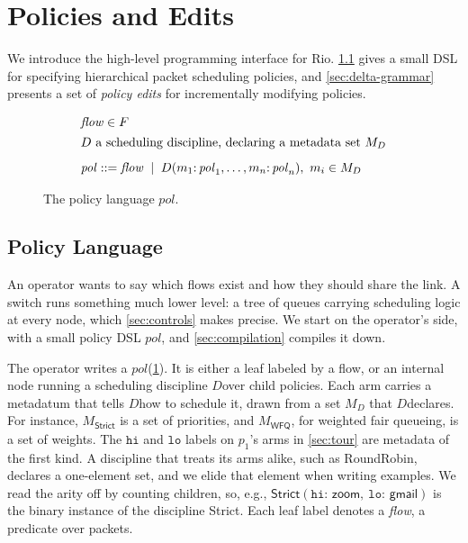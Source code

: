 \documentclass[sigplan,anonymous,review,nonacm]{acmart}
\newcommand{\notation}[1]{\ensuremath{#1}\ifmmode\else\xspace\fi}
\newcommand{\pol}{\notation{\mathit{pol}}}
\newcommand{\disc}{\notation{D}}
\newcommand{\Strict}{\textsf{Strict}}
\newcommand{\WFQ}{\textsf{WFQ}}
\newcommand{\RR}{\textsf{RoundRobin}}
\begin{document}
\section{Policies and Edits}\label{sec:model}

We introduce the high-level programming interface for Rio.
\cref{sec:policy-dsl} gives a small DSL for specifying hierarchical packet scheduling policies,
and \cref{sec:delta-grammar} presents a set of \emph{policy edits} for incrementally modifying policies.

\begin{figure}[t]
\[
\begin{array}{@{}l@{}}
\mathit{flow} \in F\\[4pt]
D\ \text{a scheduling discipline, declaring a metadata set } M_{D}\\[8pt]
\mathit{pol} \mathrel{::=} \mathit{flow} \;\mid\; D(m_1{:}\,\mathit{pol}_1, \ldots, m_n{:}\,\mathit{pol}_n),\ m_i \in M_{D}
\end{array}
\]
\caption{The policy language \(\mathit{pol}\).}
\label{fig:pol-grammar}
\end{figure}

\subsection{Policy Language}\label{sec:policy-dsl}

An operator wants to say which flows exist and how they should share the link.
A switch runs something much lower level: a tree of queues carrying scheduling logic at every node, which \cref{sec:controls} makes precise.
We start on the operator's side, with a small policy DSL \pol, and \cref{sec:compilation} compiles it down.

The operator writes a \pol (\cref{fig:pol-grammar}).
It is either a leaf labeled by a flow, or an internal node running a scheduling discipline \disc over child policies.
Each arm carries a metadatum that tells \disc how to schedule it, drawn from a set \(M_{D}\) that \disc declares.
For instance, \(M_{\Strict}\) is a set of priorities, and \(M_{\WFQ}\), for weighted fair queueing, is a set of weights.
The \(\mathtt{hi}\) and \(\mathtt{lo}\) labels on \(p_1\)'s arms in \cref{sec:tour} are metadata of the first kind.
A discipline that treats its arms alike, such as \RR, declares a one-element set, and we elide that element when writing examples.
We read the arity off by counting children, so, e.g., \(\Strict(\mathtt{hi}{:}\,\textsf{zoom},\allowbreak\ \mathtt{lo}{:}\,\textsf{gmail})\) is the binary instance of the discipline \Strict.
Each leaf label denotes a \emph{flow}, a predicate over packets.
\end{document}
